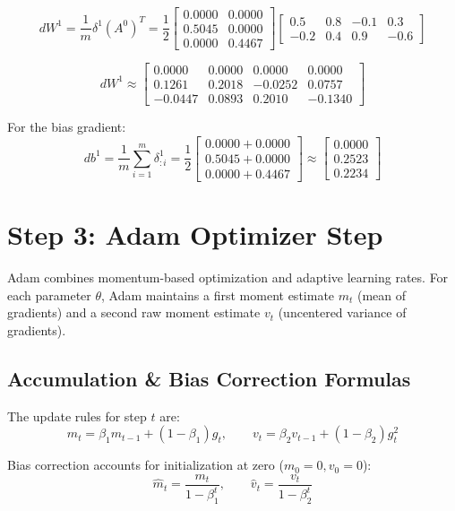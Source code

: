 \documentclass[11pt]{article}
\begin{document}
\[
dW^1 = \frac{1}{m}\delta^1 (A^0)^T = \frac{1}{2} \begin{bmatrix} 0.0000 & 0.0000 \\ 0.5045 & 0.0000 \\ 0.0000 & 0.4467 \end{bmatrix} \begin{bmatrix} 0.5 & 0.8 & -0.1 & 0.3 \\ -0.2 & 0.4 & 0.9 & -0.6 \end{bmatrix}
\]

\[
dW^1 \approx
\begin{bmatrix}
0.0000 & 0.0000 & 0.0000 & 0.0000 \\
0.1261 & 0.2018 & -0.0252 & 0.0757 \\
-0.0447 & 0.0893 & 0.2010 & -0.1340
\end{bmatrix}
\]

For the bias gradient:
\[
db^1 = \frac{1}{m}\sum_{i=1}^m \delta^1_{:i} = \frac{1}{2} \begin{bmatrix} 0.0000 + 0.0000 \\ 0.5045 + 0.0000 \\ 0.0000 + 0.4467 \end{bmatrix} \approx \begin{bmatrix} 0.0000 \\ 0.2523 \\ 0.2234 \end{bmatrix}
\]

\newpage
\section{Step 3: Adam Optimizer Step}

Adam combines momentum-based optimization and adaptive learning rates. For each parameter $\theta$, Adam maintains a first moment estimate $m_t$ (mean of gradients) and a second raw moment estimate $v_t$ (uncentered variance of gradients).

\subsection{Accumulation \& Bias Correction Formulas}

The update rules for step $t$ are:
\[
m_t = \beta_1 m_{t-1} + (1-\beta_1)g_t, \qquad v_t = \beta_2 v_{t-1} + (1-\beta_2)g_t^2
\]

Bias correction accounts for initialization at zero ($m_0=0, v_0=0$):
\[
\hat{m}_t = \frac{m_t}{1-\beta_1^t}, \qquad \hat{v}_t = \frac{v_t}{1-\beta_2^t}
\]
\end{document}
